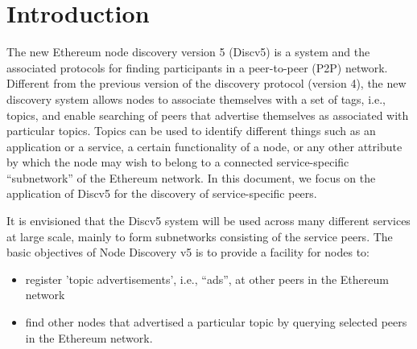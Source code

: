 
\section{Introduction}

The new Ethereum node discovery version 5 (Discv5) is a system and the associated protocols for finding participants in a peer-to-peer (P2P) network. Different from the previous version of the discovery protocol (version 4), the new discovery system allows nodes to associate themselves with a set of tags, i.e., topics, and enable searching of peers that advertise themselves as associated with particular topics. Topics can be used to identify different things such as an application or a service, a certain functionality of a node, or any other attribute by which the node may wish to belong to a connected service-specific “subnetwork” of the Ethereum network. In this document, we focus on the application of Discv5 for the discovery of service-specific peers.

It is envisioned that the Discv5 system will be used across many different services at large scale, mainly to form subnetworks consisting of the service peers. The basic objectives of Node Discovery v5 is to provide a facility for nodes to:
\begin{itemize}
    \item register 'topic advertisements', i.e., “ads”, at other peers in the Ethereum network
    \item find other nodes that advertised a particular topic by querying selected peers in the Ethereum network.
\end{itemize}

    
    
